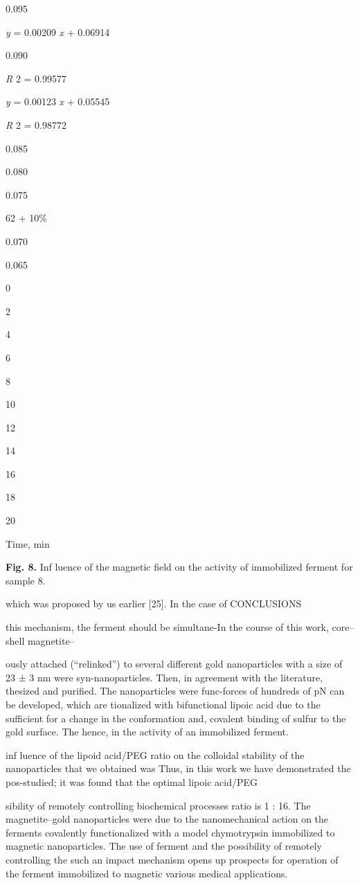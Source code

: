 \documentclass[12pt,a4paper]{article}
\begin{document}
0.095

\emph{y} = 0.00209 \emph{x} + 0.06914

0.090

\emph{R} 2 = 0.99577

\emph{y} = 0.00123 \emph{x} + 0.05545

\emph{R} 2 = 0.98772

0.085

0.080

0.075

62 + 10\%

0.070

0.065

0

2

4

6

8

10

12

14

16

18

20

Time, min

\textbf{Fig. 8.} Inf luence of the magnetic field on the activity of
immobilized ferment for sample 8.

which was proposed by us earlier {[}25{]}. In the case of CONCLUSIONS

this mechanism, the ferment should be simultane-In the course of this
work, core--shell magnetite--

ously attached (``relinked'') to several different gold nanoparticles
with a size of 23 ± 3 nm were syn-nanoparticles. Then, in agreement with
the literature, thesized and purified. The nanoparticles were
func-forces of hundreds of pN can be developed, which are tionalized
with bifunctional lipoic acid due to the sufficient for a change in the
conformation and, covalent binding of sulfur to the gold surface. The
hence, in the activity of an immobilized ferment.

inf luence of the lipoid acid/PEG ratio on the colloidal stability of
the nanoparticles that we obtained was Thus, in this work we have
demonstrated the pos-studied; it was found that the optimal lipoic
acid/PEG

sibility of remotely controlling biochemical processes ratio is 1 : 16.
The magnetite--gold nanoparticles were due to the nanomechanical action
on the ferments covalently functionalized with a model chymotrypsin
immobilized to magnetic nanoparticles. The use of ferment and the
possibility of remotely controlling the such an impact mechanism opens
up prospects for operation of the ferment immobilized to magnetic
various medical applications.
\end{document}
